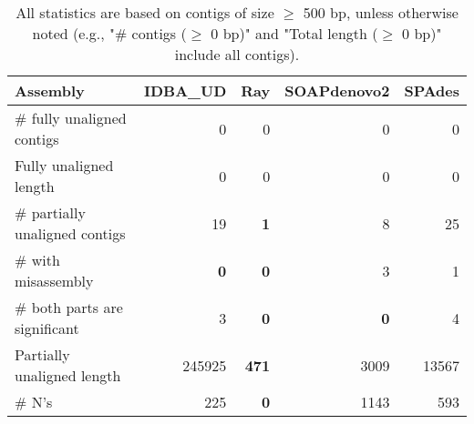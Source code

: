 \documentclass[12pt,a4paper]{article}
\begin{document}
\begin{table}[ht]
\begin{center}
\caption{All statistics are based on contigs of size $\geq$ 500 bp, unless otherwise noted (e.g., "\# contigs ($\geq$ 0 bp)" and "Total length ($\geq$ 0 bp)" include all contigs).}
\begin{tabular}{|l*{4}{|r}|}
\hline
Assembly & IDBA\_UD & Ray & SOAPdenovo2 & SPAdes \\ \hline
\# fully unaligned contigs & 0 & 0 & 0 & 0 \\ \hline
Fully unaligned length & 0 & 0 & 0 & 0 \\ \hline
\# partially unaligned contigs & 19 & {\bf 1} & 8 & 25 \\ \hline
\hspace{5mm}\# with misassembly & {\bf 0} & {\bf 0} & 3 & 1 \\ \hline
\hspace{5mm}\# both parts are significant & 3 & {\bf 0} & {\bf 0} & 4 \\ \hline
Partially unaligned length & 245925 & {\bf 471} & 3009 & 13567 \\ \hline
\# N's & 225 & {\bf 0} & 1143 & 593 \\ \hline
\end{tabular}
\end{center}
\end{table}
\end{document}
